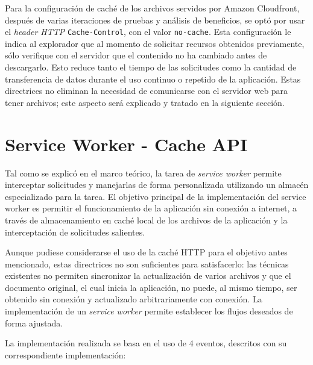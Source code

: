 Para la configuración de caché de los archivos servidos por Amazon Cloudfront, después de varias iteraciones de pruebas y análisis de beneficios, se optó por usar el \textit{header HTTP} \texttt{Cache-Control}, con el valor \texttt{no-cache}. Esta configuración le indica al explorador que al momento de solicitar recursos obtenidos previamente, sólo verifique con el servidor que el contenido no ha cambiado antes de descargarlo. Esto reduce tanto el tiempo de las solicitudes como la cantidad de transferencia de datos durante el uso continuo o repetido de la aplicación. Estas directrices no eliminan la necesidad de comunicarse con el servidor web para tener archivos; este aspecto será explicado y tratado en la siguiente sección.

\section{Service Worker - Cache API}

Tal como se explicó en el marco teórico, la tarea de \textit{service worker} permite interceptar solicitudes y manejarlas de forma personalizada utilizando un almacén especializado para la tarea. El objetivo principal de la implementación del service worker es permitir el funcionamiento de la aplicación sin conexión a internet, a través de almacenamiento en caché local de los archivos de la aplicación y la interceptación de solicitudes salientes.

Aunque pudiese considerarse el uso de la caché HTTP para el objetivo antes mencionado, estas directrices no son suficientes para satisfacerlo: las técnicas existentes no permiten sincronizar la actualización de varios archivos y que el documento original, el cual inicia la aplicación, no puede, al mismo tiempo, ser obtenido sin conexión y actualizado arbitrariamente con conexión. La implementación de un \textit{service worker} permite establecer los flujos deseados de forma ajustada.

La implementación realizada se basa en el uso de 4 eventos, descritos con su correspondiente implementación:

